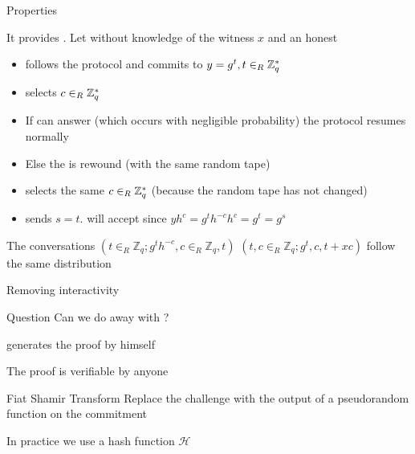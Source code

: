 \documentclass[handout]{beamer}
\begin{document}
\begin{frame}[allowframebreaks]{Properties}
\framebreak

It provides . Let  \siml without knowledge of the witness $x$ and an honest \ver 
 
\begin{itemize}
\item \siml follows the protocol and commits to $y=g^t, t \in_R \mathbb{Z}^*_{q}$
\item \ver selects $c \in_R \mathbb{Z}^*_{q}$
\item If \siml can answer (which occurs with negligible probability) the protocol resumes normally  
\item Else the \ver is rewound (with the same random tape)  
\item \ver selects the same $c \in_R \mathbb{Z}^*_{q}$ (because the random tape has not changed)  
\item \siml sends $s=t$. \ver will accept since $yh^{c} = g^t  h^{-c} h^{c} = g^t = g^s$ 
\end{itemize}
  
The conversations $(t \in_R \mathbb{Z}_q; g^t h^{-c}   , c \in_R \mathbb{Z}_q  , t )$ 
$(t,c \in_R \mathbb{Z}_q;  g^t  , c  , t+xc  )$
 follow the same distribution
\end{frame}
 

\begin{frame}{Removing interactivity}
\begin{block}{Question}
Can we do away with \ver?
\end{block}

\prv generates the proof by himself

The proof is verifiable by anyone

\begin{block}{Fiat Shamir Transform}
Replace the challenge with the output of a pseudorandom function on the commitment

In practice we use a hash function $\mathcal{H}$
\end{block}
\end{frame}
\end{document}
